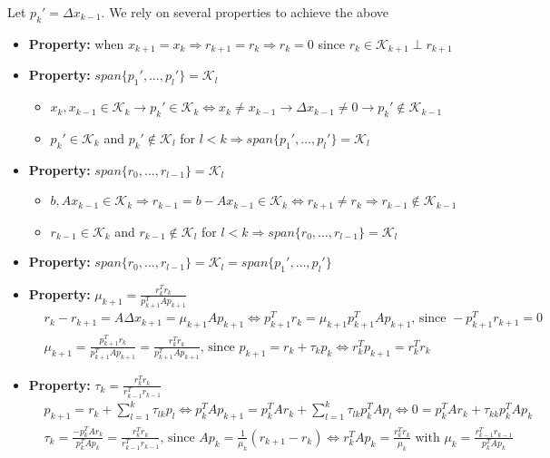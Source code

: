 \documentclass{article}
\begin{document}
Let $p_k' = \Delta x_{k-1}$. We rely on several properties to achieve the above\\
\begin{itemize}
    \item \textbf{Property:} when $x_{k+1} = x_k \Rightarrow r_{k+1} = r_k \Rightarrow r_k = 0$ since $r_k \in \mathcal{K}_{k+1} \perp r_{k+1}$
    \item \textbf{Property:} $span\{p_1', \dots, p_l'\} = \mathcal{K}_l$
    \begin{itemize}
        \item $x_k, x_{k-1} \in \mathcal{K}_k \rightarrow p_k' \in \mathcal{K}_k \Longleftrightarrow x_k \neq x_{k-1} \rightarrow \Delta x_{k-1} \neq 0 \rightarrow p_k' \notin \mathcal{K}_{k-1}$
        \item $p_k' \in \mathcal{K}_k$ and $p_k' \notin \mathcal{K}_l$ for $l < k \Longrightarrow span\{p_1', \dots, p_l'\} = \mathcal{K}_l$
    \end{itemize}
    \item \textbf{Property:} $span\{r_0, \dots, r_{l-1}\} = \mathcal{K}_l$
    \begin{itemize}
        \item $b, Ax_{k-1} \in \mathcal{K}_k \Longrightarrow r_{k-1} = b-Ax_{k-1} \in \mathcal{K}_k \Longleftrightarrow r_{k+1} \neq r_k \Longrightarrow r_{k-1} \notin \mathcal{K}_{k-1}$
        \item $r_{k-1} \in \mathcal{K}_k$ and $r_{k-1} \notin \mathcal{K}_{l}$ for $l < k \Longrightarrow span\{r_0, \dots, r_{l-1}\} = \mathcal{K}_l$
    \end{itemize}
    \item \textbf{Property:} $span\{r_0, \dots, r_{l-1}\} = \mathcal{K}_l = span\{p_1', \dots, p_l'\}$
    \item \textbf{Property:} $\mu_{k+1} = \frac{r_k^Tr_k}{p_{k+1}^TAp_{k+1}}$
    \begin{align*}
        &r_k - r_{k+1} = A\Delta x_{k+1} = \mu_{k+1}Ap_{k+1} \Longleftrightarrow p_{k+1}^Tr_k = \mu_{k+1}p_{k+1}^TAp_{k+1} \textrm{, since } - p_{k+1}^Tr_{k+1} =0\\
        &\mu_{k+1} = \frac{p_{k+1}^Tr_k}{p_{k+1}^TAp_{k+1}} = \frac{r_k^Tr_k}{p_{k+1}^TAp_{k+1}} \textrm{, since } p_{k+1} = r_k + \tau_kp_k \Longleftrightarrow r_k^Tp_{k+1} = r_k^Tr_k
    \end{align*}
    \item \textbf{Property:} $\tau_k = \frac{r_k^Tr_k}{r_{k-1}^Tr_{k-1}}$
    \begin{align*}
        &p_{k+1} = r_k + \sum_{l=1}^k \tau_{lk}p_l \Longleftrightarrow p_k^TAp_{k+1} = p_k^TAr_k + \sum_{l=1}^k \tau_{lk}p_k^TAp_l \Longleftrightarrow 0 = p_k^TAr_k + \tau_{kk}p_k^TAp_k\\
        &\tau_k = \frac{-p_k^TAr_k}{p_k^TAp_k} = \frac{r_k^Tr_k}{r_{k-1}^Tr_{k-1}} \textrm{, since } Ap_k = \frac{1}{\mu_k}(r_{k+1} - r_k) \Longleftrightarrow r_k^TAp_k = \frac{r_k^Tr_k}{\mu_k} \textrm{ with } \mu_k = \frac{r_{k-1}^Tr_{k-1}}{p_k^TAp_k}
    \end{align*}
\end{itemize}
\end{document}
